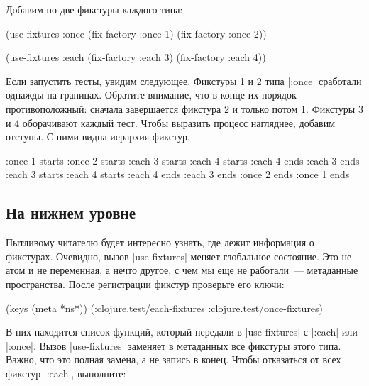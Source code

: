 Добавим по две фикстуры каждого типа:

\begin{english}
  \begin{clojure}
(use-fixtures :once
  (fix-factory :once 1)
  (fix-factory :once 2))

(use-fixtures :each
  (fix-factory :each 3)
  (fix-factory :each 4))
  \end{clojure}
\end{english}

Если запустить тесты, увидим следующее. Фикстуры 1 и 2 типа \spverb|:once|
сработали однажды на границах. Обратите внимание, что в конце их порядок
противоположный: сначала завершается фикстура 2 и только потом 1. Фикстуры 3 и 4
оборачивают каждый тест. Чтобы выразить процесс нагляднее, добавим отступы. С
ними видна иерархия фикстур.

\begin{english}
  \begin{clojure}
:once 1 starts
  :once 2 starts
    :each 3 starts
      :each 4 starts
      :each 4 ends
    :each 3 ends
    :each 3 starts
      :each 4 starts
      :each 4 ends
    :each 3 ends
  :once 2 ends
:once 1 ends
  \end{clojure}
\end{english}

\subsection{На нижнем уровне}

Пытливому читателю будет интересно узнать, где лежит информация о
фикстурах. Очевидно, вызов \spverb|use-fixtures| меняет глобальное
состояние. Это не атом и не переменная, а нечто другое, с чем мы еще не
работали~--- метаданные пространства. После регистрации фикстур проверьте его
ключи:

\begin{english}
  \begin{clojure}
(keys (meta *ns*))
(:clojure.test/each-fixtures :clojure.test/once-fixtures)
  \end{clojure}
\end{english}

В них находится список функций, который передали в \spverb|use-fixtures| с
\spverb|:each| или \spverb|:once|. Вызов \spverb|use-fixtures| заменяет в
метаданных все фикстуры этого типа. Важно, что это полная замена, а не запись в
конец. Чтобы отказаться от всех фикстур \spverb|:each|, выполните:

